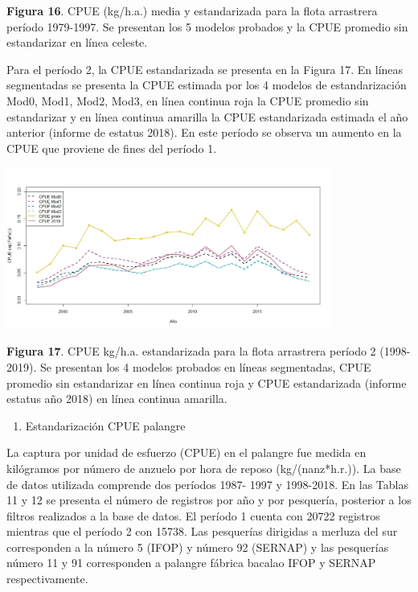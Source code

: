 \documentclass[
  spanish,
]{article}
\providecommand{\tightlist}{%
  \setlength{\itemsep}{0pt}\setlength{\parskip}{0pt}}
\begin{document}
\small \textbf{Figura 16}. CPUE (kg/h.a.) media y estandarizada para la
flota arrastrera período 1979-1997. Se presentan los 5 modelos probados
y la CPUE promedio sin estandarizar en línea celeste. \vspace{0.5cm}
\normalsize

Para el período 2, la CPUE estandarizada se presenta en la Figura 17. En
líneas segmentadas se presenta la CPUE estimada por los 4 modelos de
estandarización Mod0, Mod1, Mod2, Mod3, en línea continua roja la CPUE
promedio sin estandarizar y en línea continua amarilla la CPUE
estandarizada estimada el año anterior (informe de estatus 2018). En
este período se observa un aumento en la CPUE que proviene de fines del
período 1.

\begin{center}
\includegraphics[width=0.8\textwidth]{Figuras/Figura_17.png}
\end{center}

\small \textbf{Figura 17}. CPUE kg/h.a. estandarizada para la flota
arrastrera período 2 (1998-2019). Se presentan los 4 modelos probados en
líneas segmentadas, CPUE promedio sin estandarizar en línea continua
roja y CPUE estandarizada (informe estatus año 2018) en línea continua
amarilla. \vspace{0.5cm} \normalsize

\begin{enumerate}
\def\labelenumi{\alph{enumi})}
\setcounter{enumi}{1}
\tightlist
\item
  Estandarización CPUE palangre
\end{enumerate}

La captura por unidad de esfuerzo (CPUE) en el palangre fue medida en
kilógramos por número de anzuelo por hora de reposo (kg/(nanz*h.r.)). La
base de datos utilizada comprende dos períodos 1987- 1997 y 1998-2018.
En las Tablas 11 y 12 se presenta el número de registros por año y por
pesquería, posterior a los filtros realizados a la base de datos. El
período 1 cuenta con 20722 registros mientras que el período 2 con
15738. Las pesquerías dirigidas a merluza del sur corresponden a la
número 5 (IFOP) y número 92 (SERNAP) y las pesquerías número 11 y 91
corresponden a palangre fábrica bacalao IFOP y SERNAP respectivamente.
\end{document}
